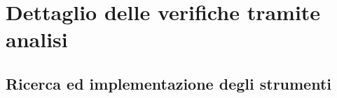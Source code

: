 %


\section{Dettaglio delle verifiche tramite analisi}
	\subsection{Ricerca ed implementazione degli strumenti}
